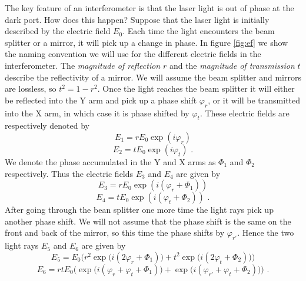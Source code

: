 \documentclass[11pt]{cuthesis}
\newcommand{\fs}{\text{ .}}
\begin{document}
The key feature of an interferometer is that the laser light is out of phase at the dark port. How does this happen? Suppose that the laser light is initially described by the electric field $E_0$. Each time the light encounters the beam splitter or a mirror, it will pick up a change in phase. In figure \ref{fig:ef} we show the naming convention we will use for the different electric fields in the interferometer. The \emph{magnitude of reflection} $r$ and the \emph{magnitude of transmission} $t$ describe the reflectivity of a mirror. We will assume the beam splitter and mirrors are lossless, so $t^2=1-r^2$. Once the light reaches the beam splitter it will either be reflected into the Y arm and pick up a phase shift $\varphi_r$, or it will be transmitted into the X arm, in which case it is phase shifted by $\varphi_t$. These electric fields are respectively denoted by
\begin{equation} \label{E1}
E_1=r E_0  \exp(i \varphi_r)
\end{equation}
\begin{equation} \label{E2}
E_2=t E_0  \exp(i \varphi_t) \fs
\end{equation}
We denote the phase accumulated in the Y and X arms as $\Phi_1$ and $\Phi_2$ respectively. Thus the electric fields $E_3$ and $E_4$ are given by
\begin{equation}
E_3=r E_0  \exp(i( \varphi_r+\Phi_1))
\end{equation}
\begin{equation}
E_4=t E_0  \exp (i( \varphi_t+\Phi_2)) \fs
\end{equation}
After going through the bean splitter one more time the light rays pick up another phase shift. We will not assume that the phase shift is the same on the front and back of the mirror, so this time the phase shifts by $\varphi_{r'}$. Hence the two light rays $E_5$ and $E_6$ are given by
\begin{equation}
E_5= E_0 \bigg(r^2 \exp \big( i ( 2\varphi_r+\Phi_1) \big)+t^2 \exp \big( i(2 \varphi_t+\Phi_2) \big) \bigg)
\end{equation}
\begin{equation} \label{E_6}
E_6=r t E_0 \bigg( \exp \big( i (\varphi_r+\varphi_t+\Phi_1) \big)+ \exp \big( i( \varphi_{r'}+\varphi_t+\Phi_2) \big) \bigg) \fs
\end{equation}
\end{document}
